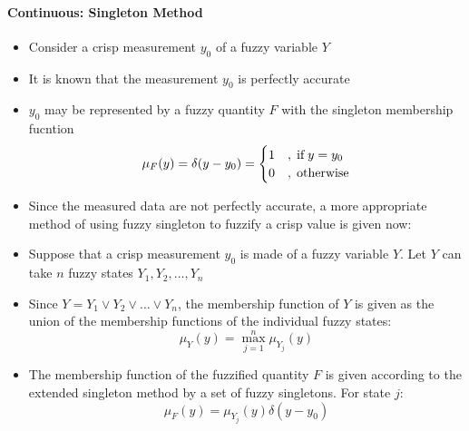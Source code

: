 \documentclass{tron}
\begin{document}
\paragraph{Continuous: Singleton Method}
\begin{itemize}
	\item Consider a crisp measurement $y_0$ of a fuzzy variable $Y$
	\item It is known that the measurement $y_0$ is perfectly accurate
	\item $y_0$ may be represented by a fuzzy quantity $F$ with the singleton membership fucntion
	\begin{equation}
		\mu_F(y) = \delta (y-y_0) = \begin{cases}
			1 & ,\;\text{if}\; y = y_0\\
			0 & ,\;\text{otherwise}
		\end{cases}
	\end{equation}
	\item Since the measured data are not perfectly accurate, a more appropriate method of using fuzzy singleton to fuzzify a crisp value is given now:
	\item Suppose that a crisp measurement $y_0$ is made of a fuzzy variable $Y$. Let $Y$ can take $n$ fuzzy states $Y_1, Y_2, \dots, Y_n$
	\item Since $Y=Y_1 \lor  Y_2 \lor \dots \lor Y_n$, the membership function of $Y$ is given as the union of the membership functions of the individual fuzzy states:
	\begin{equation}
		\mu_Y(y) = \max_{j=1}^n \mu_{Y_j} (y)
	\end{equation}
	\item The membership function of the fuzzified quantity $F$ is given according to the extended singleton method by a set of fuzzy singletons. For state $j$:
	\begin{equation}
		\mu_F(y) = \mu_{Y_j}(y) \delta (y-y_0)
	\end{equation}
\end{itemize}

\end{document}
